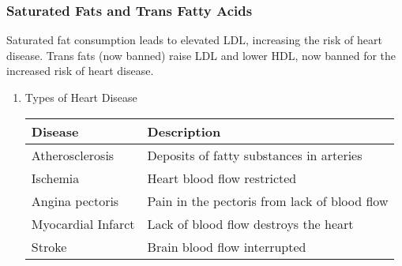 \documentclass[letterpaper, 11pt]{article}
\begin{document}
\subsubsection{Saturated Fats and Trans Fatty Acids}
\label{sec:orgdf6fc4f}
Saturated fat consumption leads to elevated LDL, increasing the risk of heart disease. Trans fats (now banned) raise LDL and lower HDL, now banned for the increased risk of heart disease.\\
\begin{enumerate}
\item Types of Heart Disease
\label{sec:org12f56bd}
\begin{center}
\begin{tabular}{ll}
Disease & Description\\
\hline
Atherosclerosis & Deposits of fatty substances in arteries\\
Ischemia & Heart blood flow restricted\\
Angina pectoris & Pain in the pectoris from lack of blood flow\\
Myocardial Infarct & Lack of blood flow destroys the heart\\
Stroke & Brain blood flow interrupted\\
\end{tabular}
\end{center}
\end{enumerate}
\end{document}
